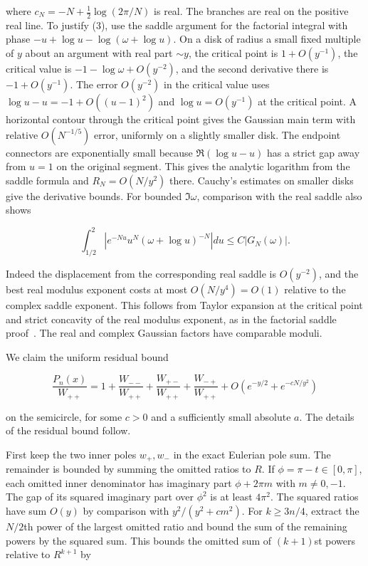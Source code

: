 \documentclass[11pt]{article}
\begin{document}
where $c_N=-N+\frac12\log(2\pi/N)$ is real. The branches are real on the positive real line. To justify (3), use the saddle argument for the factorial integral with phase $-u+\log u-\log(\omega+\log u)$. On a disk of radius a small fixed multiple of $y$ about an argument with real part $\sim y$, the critical point is $1+O(y^{-1})$, the critical value is $-1-\log\omega+O(y^{-2})$, and the second derivative there is $-1+O(y^{-1})$. The error $O(y^{-2})$ in the critical value uses $\log u-u=-1+O((u-1)^2)$ and $\log u=O(y^{-1})$ at the critical point. A horizontal contour through the critical point gives the Gaussian main term with relative $O(N^{-1/5})$ error, uniformly on a slightly smaller disk. The endpoint connectors are exponentially small because $\Re(\log u-u)$ has a strict gap away from $u=1$ on the original segment. This gives the analytic logarithm from the saddle formula and $R_N=O(N/y^2)$ there. Cauchy's estimates on smaller disks give the derivative bounds. For bounded $\Im\omega$, comparison with the real saddle also shows

\[
\int_{1/2}^2\left|e^{-Nu}u^N(\omega+\log u)^{-N}\right|du\le C|G_N(\omega)|.
\tag{4}
\]

Indeed the displacement from the corresponding real saddle is $O(y^{-2})$, and the best real modulus exponent costs at most $O(N/y^4)=O(1)$ relative to the complex saddle exponent. This follows from Taylor expansion at the critical point and strict concavity of the real modulus exponent, as in the factorial saddle proof~\cite{disk}. The real and complex Gaussian factors have comparable moduli.

We claim the uniform residual bound

\[
\frac{P_n(x)}{W_{++}}=1+\frac{W_{--}}{W_{++}}+\frac{W_{+-}}{W_{++}}+\frac{W_{-+}}{W_{++}}
+O(e^{-y/2}+e^{-cN/y^2})
\tag{5}
\]

on the semicircle, for some $c>0$ and a sufficiently small absolute $a$. The details of the residual bound follow.

First keep the two inner poles $w_+,w_-$ in the exact Eulerian pole sum. The remainder is bounded by summing the omitted ratios to $R$. If $\phi=\pi-t\in[0,\pi]$, each omitted inner denominator has imaginary part $\phi+2\pi m$ with $m\ne0,-1$. The gap of its squared imaginary part over $\phi^2$ is at least $4\pi^2$. The squared ratios have sum $O(y)$ by comparison with $y^2/(y^2+c m^2)$. For $k\ge3n/4$, extract the $N/2$th power of the largest omitted ratio and bound the sum of the remaining powers by the squared sum. This bounds the omitted sum of $(k+1)$st powers relative to $R^{k+1}$ by
\end{document}
